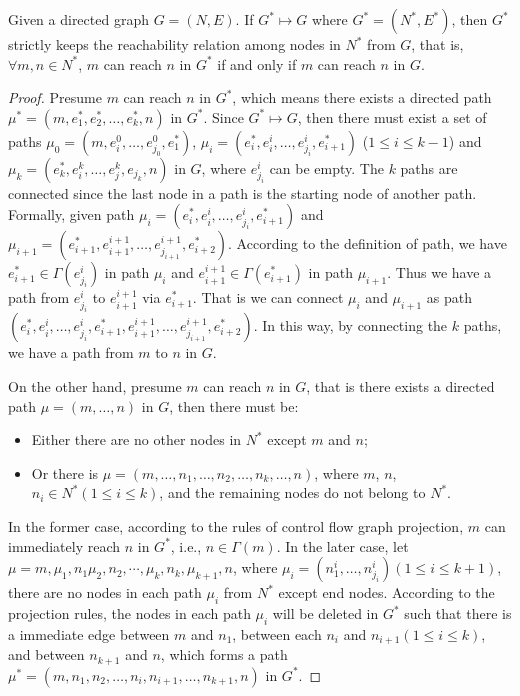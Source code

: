 \begin{theorem}
Given a directed graph $G = (N, E)$. If $G^* \mapsto G$ where $G^*=(N^*, E^*)$, then $G^*$ strictly keeps the reachability relation among nodes in $N^*$ from $G$, that is, $\forall m,n\in N^*$, $m$ can reach $n$ in $G^*$ if and only if $m$ can reach $n$ in $G$.
\end{theorem}
\begin{proof} Presume $m$ can reach $n$ in $G^*$, which means there exists a directed path $\mu^*=(m,e_1^*,e_2^*,\ldots,e_k^*,n)$ in $G^*$. 
Since $G^* \mapsto G$, then there must exist a set of paths $\mu_0=(m,e^0_i,\ldots,e^0_{j_0}, e_1^*)$, $\mu_i=(e^*_{i}, e^{i}_i,\ldots,e^{i}_{j_i}, e_{i+1}^*)$ ($1\leq i\leq k-1$) and $\mu_k=(e_k^*,e^k_i,\ldots,e^k_j, e_{j_k}, n)$ in $G$, where $e^{i}_{j_i}$ can be empty. The $k$ paths are connected since the last node in a path is the starting node of another path. Formally, given path $\mu_i=(e^*_{i}, e^{i}_i,\ldots,e^{i}_{j_i}, e_{i+1}^*)$ and $\mu_{i+1}=(e^*_{i+1}, e^{i+1}_{i+1},\ldots,e^{i+1}_{j_{i+1}}, e_{i+2}^*)$. According to the definition of path, we have $e_{i+1}^*\in \Gamma(e^{i}_{j_i})$ in path $\mu_i$
and $e^{i+1}_{i+1} \in \Gamma(e^*_{i+1})$ in path $\mu_{i+1}$. Thus we have a path from $e^{i}_{j_i}$ to $e^{i+1}_{i+1}$ via $e^*_{i+1}$. That is we can connect $\mu_i$ and $\mu_{i+1}$ as path $(e^*_{i},e^{i}_i,\ldots,e^{i}_{j_i}, e_{i+1}^*, e^{i+1}_{i+1},\ldots,e^{i+1}_{j_{i+1}}, e_{i+2}^*)$. In this way, by connecting the $k$ paths, we have a path from $m$ to $n$ in $G$.

On the other hand, presume $m$ can reach $n$ in $G$, that is there exists a directed path $\mu=(m,\ldots,n)$ in $G$, then there must be:
\begin{itemize}
\item
Either there are no other nodes in $N^*$ except $m$ and $n$; 
\item
Or there is $\mu=(m,\ldots,n_1,\ldots,n_2,\ldots,n_k,\ldots,n)$, where $m$, $n$, $n_i\in N^* (1\leq i \leq k)$, and the remaining nodes do not belong to $N^*$.
\end{itemize}
%

In the former case, according to the rules of control flow graph projection, $m$ can immediately reach $n$ in $G^*$, i.e., $n\in \Gamma(m)$.
%
In the later case, let $\mu=m,\mu_1,n_1\mu_2, n_2,\cdots,\mu_k, n_k, \mu_{k+1}, n$, where $\mu_i=(n^i_{1},\ldots,n^i_{j_i}) (1\leq i\leq k+1)$, there are no nodes in each path $\mu_i$ from $N^*$ except end nodes. According to the projection rules, the nodes in each path $\mu_i$ will be deleted in $G^*$ such that there is a immediate edge between $m$ and $n_1$, between each $n_i$ and $n_{i+1} (1\leq i \leq k)$, and between $n_{k+1}$ and $n$, which forms a path $
\mu^*=(m, n_1, n_2, \ldots, n_{i}, n_{i+1}, \ldots, n_{k+1}, n)$ in $G^*$. 
\end{proof}

